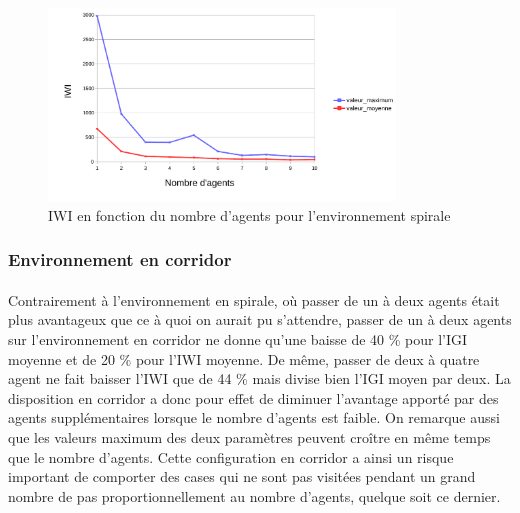 \documentclass{article}
\begin{document}
            \begin{figure}[!h]
                \begin{center}
                    \includegraphics[width = 0.82\textwidth]{graphes pdf/variance tortues IWI spirale.pdf}
                    \caption{IWI en fonction du nombre d'agents pour l'environnement spirale}
                \end{center}
            \end{figure}
            \newpage
        \subsubsection{Environnement en corridor}
            \paragraph{} Contrairement à l'environnement en spirale, où passer de un à deux agents était plus avantageux que ce à quoi on aurait pu s'attendre, passer de un à deux agents sur l'environnement en corridor ne donne qu'une baisse de 40 \% pour l'IGI moyenne et de 20 \% pour l'IWI moyenne.
            De même, passer de deux à quatre agent ne fait baisser l'IWI que de 44 \% mais divise bien l'IGI moyen par deux. La disposition en corridor a donc pour effet de diminuer l'avantage apporté par des agents supplémentaires lorsque le nombre d'agents est faible.
            On remarque aussi que les valeurs maximum des deux paramètres peuvent croître en même temps que le nombre d'agents. Cette configuration en corridor a ainsi un risque important de comporter des cases qui ne sont pas visitées pendant un grand nombre de pas proportionnellement au nombre d'agents, quelque soit ce dernier.
\end{document}
